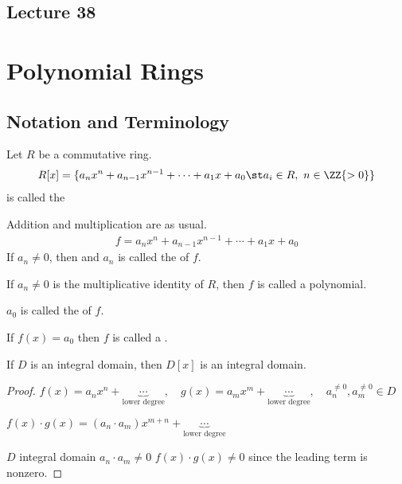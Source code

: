 \documentclass[a4paper]{article}
\begin{document}
\subsection*{Lecture 38} %
\section{Polynomial Rings}
\subsection{Notation and Terminology}
\begin{definition}
  Let \( R \) be a commutative ring.
  \begin{align*}
    R[x] = \{a_nx^n + a_{n-1}x^{n-1} + \cdots + a_1x+a_0 \st a_i\in R,\ n\in\ZZ{>0}\}
  \end{align*}
  is called the 
\end{definition}

Addition and multiplication are as usual.
\begin{align*}
  f=a_nx^n + a_{n-1}x^{n-1} + \cdots + a_1x+a_0
\end{align*}
If \( a_n\neq 0 \), then  and \( a_n \) is called the  of \( f \).

If \( a_n\neq 0 \) is the multiplicative identity of \( R \), then \( f \) is called a  polynomial.

\( a_0 \) is called the  of \( f \).

If \( f(x) = a_0 \) then \( f \) is called a .

\begin{theorem}
  If \( D \) is an integral domain, then \( D[x] \) is an integral domain.
\end{theorem}

\begin{proof}
  \( f(x) = a_nx^n+\underbrace{\cdots}_{\text{lower degree}},\quad g(x) = a_mx^m + \underbrace{\cdots}_{\text{lower degree}},\quad a_n^{\neq 0}, a_m^{\neq 0} \in D \)

  \( f(x)\cdot g(x) =  (a_n \cdot a_m)x^{m+n} + \underbrace{\cdots}_{\text{lower degree}} \)

  \( D \) integral domain \imp \( a_n\cdot a_m \neq 0 \) \imp \( f(x)\cdot g(x)\neq 0 \) since the leading term is nonzero.
\end{proof}
\end{document}
